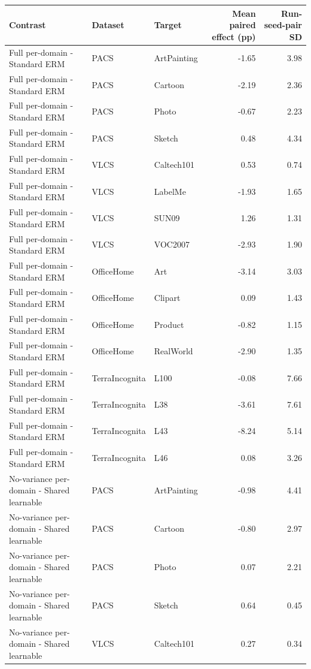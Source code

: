 \begin{tabular}{lllrr}
\toprule
Contrast & Dataset & Target & Mean paired effect (pp) & Run-seed-pair SD \\
\midrule
Full per-domain - Standard ERM & PACS & ArtPainting & -1.65 & 3.98 \\
Full per-domain - Standard ERM & PACS & Cartoon & -2.19 & 2.36 \\
Full per-domain - Standard ERM & PACS & Photo & -0.67 & 2.23 \\
Full per-domain - Standard ERM & PACS & Sketch & 0.48 & 4.34 \\
Full per-domain - Standard ERM & VLCS & Caltech101 & 0.53 & 0.74 \\
Full per-domain - Standard ERM & VLCS & LabelMe & -1.93 & 1.65 \\
Full per-domain - Standard ERM & VLCS & SUN09 & 1.26 & 1.31 \\
Full per-domain - Standard ERM & VLCS & VOC2007 & -2.93 & 1.90 \\
Full per-domain - Standard ERM & OfficeHome & Art & -3.14 & 3.03 \\
Full per-domain - Standard ERM & OfficeHome & Clipart & 0.09 & 1.43 \\
Full per-domain - Standard ERM & OfficeHome & Product & -0.82 & 1.15 \\
Full per-domain - Standard ERM & OfficeHome & RealWorld & -2.90 & 1.35 \\
Full per-domain - Standard ERM & TerraIncognita & L100 & -0.08 & 7.66 \\
Full per-domain - Standard ERM & TerraIncognita & L38 & -3.61 & 7.61 \\
Full per-domain - Standard ERM & TerraIncognita & L43 & -8.24 & 5.14 \\
Full per-domain - Standard ERM & TerraIncognita & L46 & 0.08 & 3.26 \\
No-variance per-domain - Shared learnable & PACS & ArtPainting & -0.98 & 4.41 \\
No-variance per-domain - Shared learnable & PACS & Cartoon & -0.80 & 2.97 \\
No-variance per-domain - Shared learnable & PACS & Photo & 0.07 & 2.21 \\
No-variance per-domain - Shared learnable & PACS & Sketch & 0.64 & 0.45 \\
No-variance per-domain - Shared learnable & VLCS & Caltech101 & 0.27 & 0.34 \\

\end{tabular}
